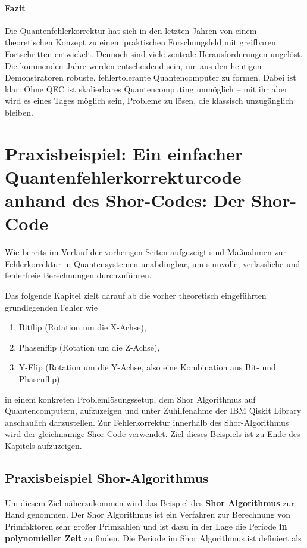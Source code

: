 \paragraph{Fazit} 
Die Quantenfehlerkorrektur hat sich in den letzten Jahren von einem theoretischen Konzept zu einem praktischen Forschungsfeld mit greifbaren Fortschritten entwickelt. Dennoch sind viele zentrale Herausforderungen ungel\"ost. Die kommenden Jahre werden entscheidend sein, um aus den heutigen Demonstratoren robuste, fehlertolerante Quantencomputer zu formen. Dabei ist klar: Ohne QEC ist skalierbares Quantencomputing unm\"oglich -- mit ihr aber wird es eines Tages m\"oglich sein, Probleme zu l\"osen, die klassisch unzug\"anglich bleiben.


\section{Praxisbeispiel: Ein einfacher Quantenfehlerkorrekturcode anhand des Shor-Codes: Der Shor-Code}
Wie bereits im Verlauf der vorherigen Seiten aufgezeigt sind Maßnahmen zur Fehlerkorrektur in Quantensystemen unabdingbar, um sinnvolle, verlässliche und fehlerfreie Berechnungen durchzuführen.

Das folgende Kapitel zielt darauf ab die vorher theoretisch eingeführten grundlegenden Fehler wie 
\begin{enumerate}
    \item Bitflip (Rotation um die X-Achse),
    \item Phasenflip (Rotation um die Z-Achse),
    \item Y-Flip (Rotation um die Y-Achse, also eine Kombination aus Bit- und Phasenflip)
\end{enumerate}
in einem konkreten Problemlösungssetup, dem Shor Algorithmus auf Quantencomputern, aufzuzeigen und unter Zuhilfenahme der IBM Qiskit Library anschaulich darzustellen. Zur Fehlerkorrektur innerhalb des Shor-Algorithmus wird der gleichnamige Shor Code verwendet.
Ziel dieses Beispiels ist zu Ende des Kapitels aufzuzeigen.

\subsection{Praxisbeispiel Shor-Algorithmus}
Um diesem Ziel näherzukommen wird das Beispiel des \textbf{Shor Algorithmus} zur Hand genommen. Der Shor Algorithmus ist ein Verfahren zur Berechnung von Primfaktoren sehr großer Primzahlen und ist dazu in der Lage die Periode \textbf{in polynomieller Zeit} zu finden.
Die Periode im Shor Algorithmus ist definiert als

